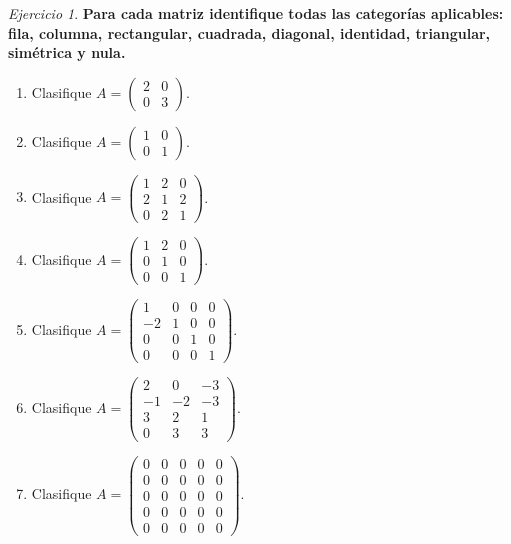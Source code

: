 \documentclass[12pt]{article}
\theoremstyle{remark}
\newtheorem{Ejer}[definicion]{Ejercicio}
\begin{document}
\begin{Ejer}

\textbf{Para cada matriz identifique todas las categorías aplicables: fila, columna, rectangular, cuadrada, diagonal, identidad, triangular, simétrica y nula.}
\begin{enumerate}[start=59]

\item Clasifique $A=\begin{pmatrix}2&0\\0&3\end{pmatrix}$.

\item Clasifique $A=\begin{pmatrix}1&0\\0&1\end{pmatrix}$.

\item Clasifique $A=\begin{pmatrix}1&2&0\\2&1&2\\0&2&1\end{pmatrix}$.

\item Clasifique $A=\begin{pmatrix}1&2&0\\0&1&0\\0&0&1\end{pmatrix}$.

\item Clasifique $A=\begin{pmatrix}1&0&0&0\\-2&1&0&0\\0&0&1&0\\0&0&0&1\end{pmatrix}$.

\item Clasifique $A=\begin{pmatrix}2&0&-3\\-1&-2&-3\\3&2&1\\0&3&3\end{pmatrix}$.

\item Clasifique $A=\begin{pmatrix}0&0&0&0&0\\0&0&0&0&0\\0&0&0&0&0\\0&0&0&0&0\\0&0&0&0&0\end{pmatrix}$.


\end{enumerate}
\end{Ejer}
\end{document}
